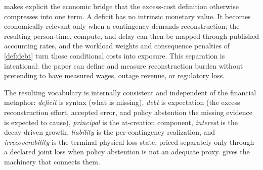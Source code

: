  makes explicit the economic bridge that the excess-cost
definition otherwise compresses into one term. A deficit has no intrinsic monetary
value. It becomes economically relevant only when a contingency demands
reconstruction; the resulting person-time, compute, and delay can then be mapped
through published accounting rates, and the workload weights and consequence
penalties of \cref{def:debt} turn those conditional costs into exposure. This
separation is intentional: the paper can define and measure reconstruction burden
without pretending to have measured wages, outage revenue, or regulatory loss.

The resulting vocabulary is internally consistent and independent of the financial
metaphor: \emph{deficit} is syntax (what is missing),
\emph{debt} is expectation (the excess reconstruction effort, accepted error, and
policy abstention the missing evidence is expected to cause),
\emph{principal} is the at-creation component, \emph{interest} is the decay-driven
growth, \emph{liability} is the per-contingency realization, and
\emph{irrecoverability} is the terminal physical loss state, priced separately only
through a declared joint loss when policy abstention is not an adequate proxy.
 gives the machinery that connects them.
